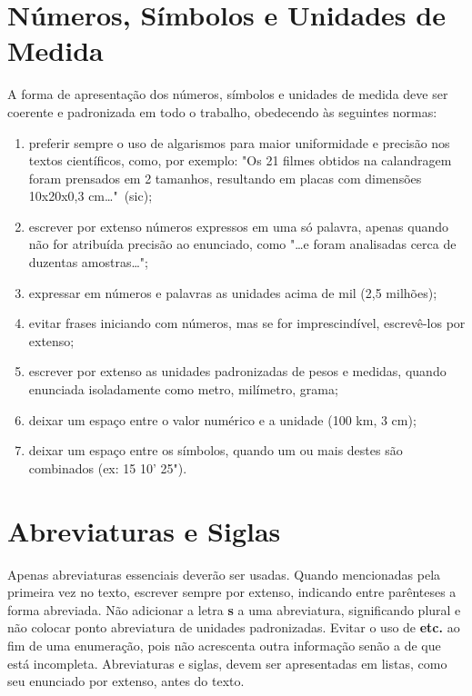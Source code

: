 \documentclass[repeatfields,xlists,xpacks,oneside,yearsonly]{ufrgscca}
\begin{document}
\begin{annex}
\section{Números, Símbolos e Unidades de Medida}

A forma de apresentação dos números, símbolos e unidades de medida deve ser
coerente e padronizada em todo o trabalho, obedecendo às seguintes normas:

\begin{enumerate}

\item preferir sempre o uso de algarismos para maior uniformidade e precisão
nos textos científicos, como, por exemplo: "Os 21 filmes obtidos na
calandragem foram prensados em 2 tamanhos, resultando em placas com
dimensões 10x20x0,3 cm\ldots"\ (sic);

\item escrever por extenso números expressos em uma só palavra, apenas
quando não for atribuída precisão ao enunciado, como "\ldots e foram analisadas
cerca de duzentas amostras\ldots";

\item expressar em números e palavras as unidades acima de mil (2,5
milhões);

\item evitar frases iniciando com números, mas se for imprescindível,
escrevê-los por extenso;

\item escrever por extenso as unidades padronizadas de pesos e medidas,
quando enunciada isoladamente como metro, milímetro, grama;

\item deixar um espaço entre o valor numérico e a unidade (100 km, 3 cm);

\item deixar um espaço entre os símbolos, quando um ou mais destes são
combinados (ex: 15  10' 25").

\end{enumerate}

\section{Abreviaturas e Siglas}

Apenas abreviaturas essenciais deverão ser usadas. Quando mencionadas pela
primeira vez no texto, escrever sempre por extenso, indicando entre
parênteses a forma abreviada. Não adicionar a letra {\bf s} a uma abreviatura,
significando plural e não colocar ponto abreviatura de unidades
padronizadas. Evitar o uso de {\bf etc.} ao fim de uma enumeração, pois não
acrescenta outra informação senão a de que está incompleta. Abreviaturas e
siglas, devem ser apresentadas em listas, como seu enunciado por extenso,
antes do texto.

\end{annex}
\end{document}
